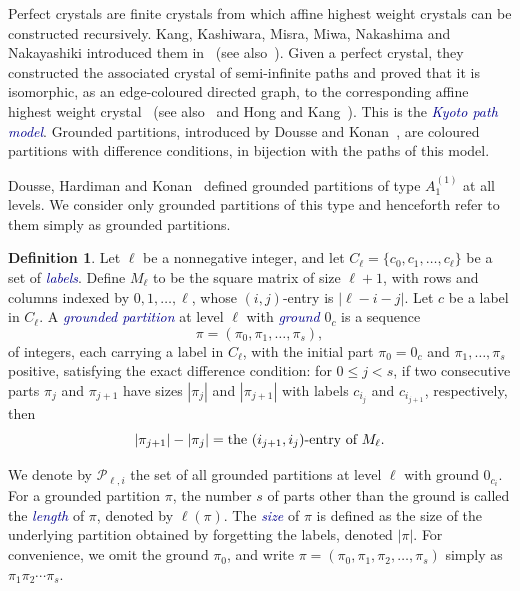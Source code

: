 \documentclass[11pt]{article}
\theoremstyle{definition}
\newtheorem{definition}[theorem]{Definition}
\theoremstyle{remark}
\theoremstyle{definition}
\numberwithin{equation}{section}
\renewcommand\emph[1]{\textcolor{darkblue}{\it #1}}
\begin{document}
Perfect crystals are finite crystals from which affine highest weight crystals can be constructed recursively. Kang, Kashiwara, Misra, Miwa, Nakashima and Nakayashiki introduced them in~\cite{KMN2a} (see also~\cite[Definition~1.1.1]{KMN92}). Given a perfect crystal, they constructed the associated crystal of semi-infinite paths and proved that it is isomorphic, as an edge-coloured directed graph, to the corresponding affine highest weight crystal~\cite[Theorem~4.5.2]{KMN2a} (see also~\cite[Proposition~1.1.2]{KMN92} and Hong and Kang~\cite[Theorem~10.6.4, p.~254]{HK02}). This is the \emph{Kyoto path model}. Grounded partitions, introduced by Dousse and Konan~\cite[Definition~3.2 and Proposition~3.4, p.~15]{DK19b}, are coloured partitions with difference conditions, in bijection with the paths of this model.

Dousse, Hardiman and Konan~\cite{DHK25} defined grounded partitions of type \( A_1^{(1)} \) at all levels. We consider only grounded partitions of this type and henceforth refer to them simply as grounded partitions.

\begin{definition}\label{def:grounded_partitions}
  Let \( \ell \) be a nonnegative integer, and let \(C_\ell=\{c_0,c_1,\ldots,c_\ell\}\) be a set of \emph{labels}.
  Define \(M_\ell\) to be the square matrix of size \(\ell+1\), with
  rows and columns indexed by \( 0,1, \dots, \ell \), whose
  \((i,j)\)-entry is \(|\ell-i-j|\).
  Let \( c \) be a label in \( C_\ell \). A \emph{grounded partition}
  at level \(\ell\) with \emph{ground} \(0_{c}\) is a sequence
  \[
    \pi = (\pi_0, \pi_1, \dots, \pi_s),
  \]
  of integers, each carrying a label in \( C_\ell \), with the initial
  part \( \pi_0 = 0_c \) and \( \pi_1, \dots, \pi_s \) positive, satisfying the exact difference condition:
  for \( 0 \leq j < s \), if two consecutive parts \(\pi_{j} \) and
  \( \pi_{j+1}\) have sizes \( |\pi_j| \) and \( |\pi_{j+1}| \) with
  labels \(c_{i_j}\) and \(c_{i_{j+1}}\), respectively, then
  \[
    |\pi_{j+1}|-|\pi_{j}| = \text{the \( (i_{j+1},i_j) \)-entry of } M_\ell.
  \]

  We denote by \(\mathcal{P}_{\ell,i}\) the set of all grounded
  partitions at level \( \ell \) with ground \(0_{c_i}\). For a
  grounded partition \( \pi \), the number \( s \) of parts other than the ground is called the \emph{length} of \( \pi \), denoted by \( \ell(\pi) \). The \emph{size} of \(\pi\) is defined as the size of the underlying
  partition obtained by forgetting the labels, denoted \(|\pi|\). For
  convenience, we omit the ground \(\pi_0\), and write
  \( \pi = (\pi_0, \pi_1, \pi_2, \dots, \pi_s) \) simply as
  \(\pi_1 \pi_2 \cdots\pi_s\).
\end{definition}
\end{document}
